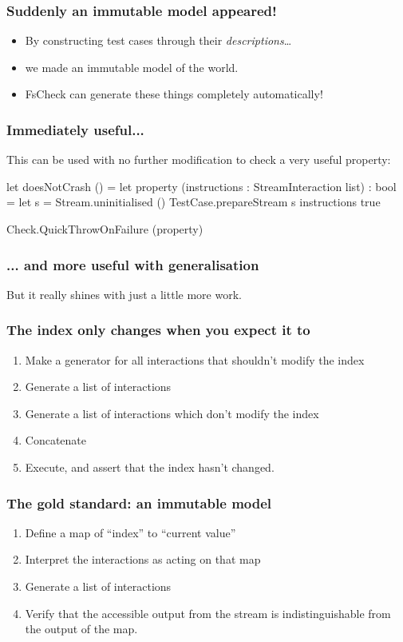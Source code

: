 \documentclass{beamer}
\begin{document}
\begin{frame}
\frametitle{Suddenly an immutable model appeared!}

\begin{itemize}
\item By constructing test cases through their \emph{descriptions}\dots
\item we made an immutable model of the world.
\item FsCheck can generate these things completely automatically!
\end{itemize}
\end{frame}

\begin{frame}[fragile]
\frametitle{Immediately useful...}
This can be used with no further modification to check a very useful property:

\begin{fslisting}
[<Test>]
let doesNotCrash () =
    let property (instructions : StreamInteraction list) : bool =
        let s = Stream.uninitialised ()
        TestCase.prepareStream s instructions
        true

    Check.QuickThrowOnFailure (property)
\end{fslisting}
\end{frame}

\begin{frame}
\frametitle{... and more useful with generalisation}
But it really shines with just a little more work.
\end{frame}

\begin{frame}
\frametitle{The index only changes when you expect it to}
\begin{enumerate}
\item Make a generator for all interactions that shouldn't modify the index
\item Generate a list of interactions
\item Generate a list of interactions which don't modify the index
\item Concatenate
\item Execute, and assert that the index hasn't changed.
\end{enumerate}
\end{frame}

\begin{frame}
\frametitle{The gold standard: an immutable model}

\begin{enumerate}
\item Define a map of ``index'' to ``current value''
\item Interpret the interactions as acting on that map
\item Generate a list of interactions
\item Verify that the accessible output from the stream is indistinguishable from the output of the map.
\end{enumerate}
\end{frame}
\end{document}
